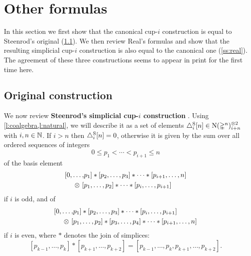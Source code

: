 
\section{Other formulas}\label{s:others}

In this section we first show that the canonical \mbox{cup-$i$} construction is equal to Steenrod's original (\cref{ss:original}).
We then review Real's formulas and show that the resulting simplicial \mbox{cup-$i$} construction is also equal to the canonical one (\cref{ss:real}).
The agreement of these three constructions seems to appear in print for the first time here.

\subsection{Original construction}\label{ss:original}

We now review \textbf{Steenrod's simplicial \mbox{cup-$i$} construction} \cite[p.293]{steenrod1947products}.
Using \cref{l:coalgebra,l:natural}, we will describe it as a set of elements $\triangle_i^{\mathrm{S}} [n] \in \operatorname{N}(\mathbb{\Delta}^n)^{\otimes 2}_{i+n}$ with $i,n \in \mathbb{N}$.
If $i > n$ then $\triangle_i^{\mathrm{S}} [n] = 0$, otherwise it is given by the sum over all ordered sequences of integers
\[
0 \leq p_1 < \cdots < p_{i+1} \leq n
\]
of the basis element
\begin{equation}\label{e:original i odd}
\begin{split}
[ 0, \dots, &{p_1} ] \ast [ {p_2}, \dots, {p_3} ] \ast \cdots \ast [ {p_{i+1}}, \dots, n ] \\
\otimes \ [ &{p_1}, \dots, {p_2} ] \ast \cdots \ast [ {p_{i}}, \dots, {p_{i+1}} ]
\end{split}
\end{equation}
if $i$ is odd, and of
\begin{equation}\label{e:original i even}
\begin{split}
[ 0, \dots, &{p_1} ] \ast [ {p_2}, \dots, {p_3} ] \ast \cdots \ast [ {p_{i}}, \dots, {p_{i+1}} ] \\
\otimes \ [ &{p_1}, \dots, {p_2} ] \ast [ {p_3}, \dots, {p_4} ] \ast \cdots \ast [ {p_{i+1}}, \dots, n ]
\end{split}
\end{equation}
if $i$ is even, where $\ast$ denotes the join of simplices:
\[
[{p_{k-1}}, \dots, {p_{k}} ] \ast [ {p_{k+1}}, \dots, p_{k+2}] = [{p_{k-1}}, \dots, p_k, p_{k+1}, \dots, p_{k+2}].
\]


